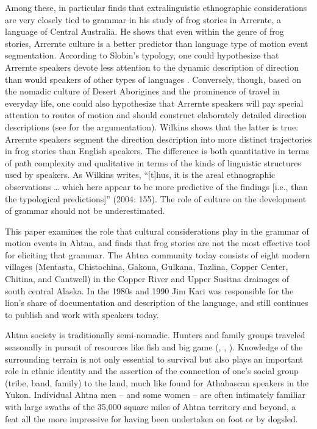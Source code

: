 Among these, \citet{Wilkins2004} in particular finds that extralinguistic ethnographic considerations are very closely tied to grammar in his study of frog stories in Arrernte, a language of Central Australia. He shows that even within the genre of frog stories, Arrernte culture is a better predictor than language type of motion event segmentation. According to Slobin’s typology, one could hypothesize that Arrernte speakers devote less attention to the dynamic description of direction than would speakers of other types of languages \citep[see][]{Slobin2004}. Conversely, though, based on the nomadic culture of Desert Aborigines and the prominence of travel in everyday life, one could also hypothesize that Arrernte speakers will pay special attention to routes of motion and should construct elaborately detailed direction descriptions (see \citealt{Wilkins2004} for the argumentation). Wilkins shows that the latter is true: Arrernte speakers segment the direction description into more distinct trajectories in frog stories than English speakers. The difference is both quantitative in terms of path complexity and qualitative in terms of the kinds of linguistic structures used by speakers. As Wilkins writes, “[t]hus, it is the areal ethnographic observations … which here appear to be more predictive of the findings [i.e., than the typological predictions]” (2004: 155). The role of culture on the development of grammar should not be underestimated.

This paper examines the role that cultural considerations play in the grammar of motion events in Ahtna, and finds that frog stories are not the most effective tool for eliciting that grammar. The Ahtna community today consists of eight modern villages (Mentasta, Chistochina, Gakona, Gulkana, Tazlina, Copper Center, Chitina, and Cantwell) in the Copper River and Upper Susitna drainages of south central Alaska. In the 1980s and 1990 Jim Kari was responsible for the lion’s share of documentation and description of the language, and still continues to publish and work with speakers today.

Ahtna society is traditionally semi-nomadic. Hunters and family groups traveled seasonally in pursuit of resources like fish and big game (\citealt{Reckord1979}, \citeyear{Reckord1983a}, \citeyear{Reckord1983b}). Knowledge of the surrounding terrain is not only essential to survival but also plays an important role in ethnic identity and the assertion of the connection of one’s social group (tribe, band, family) to the land, much like \citet{MooreTlen2007} found for Athabascan speakers in the Yukon. Individual Ahtna men – and some women – are often intimately familiar with large swaths of the 35,000 square miles of Ahtna territory and beyond, a feat all the more impressive for having been undertaken on foot or by dogsled.

